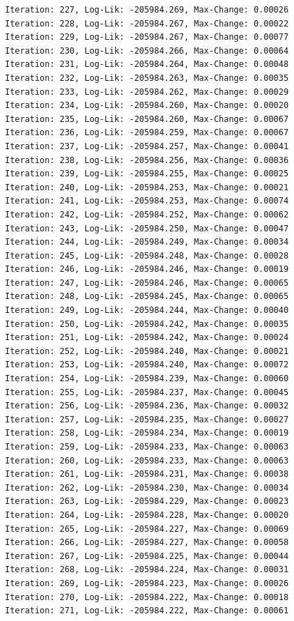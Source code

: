 \documentclass[
  letterpaper,
  DIV=11,
  numbers=noendperiod]{scrreport}
\begin{document}
\begin{verbatim}
Iteration: 227, Log-Lik: -205984.269, Max-Change: 0.00026
Iteration: 228, Log-Lik: -205984.267, Max-Change: 0.00022
Iteration: 229, Log-Lik: -205984.267, Max-Change: 0.00077
Iteration: 230, Log-Lik: -205984.266, Max-Change: 0.00064
Iteration: 231, Log-Lik: -205984.264, Max-Change: 0.00048
Iteration: 232, Log-Lik: -205984.263, Max-Change: 0.00035
Iteration: 233, Log-Lik: -205984.262, Max-Change: 0.00029
Iteration: 234, Log-Lik: -205984.260, Max-Change: 0.00020
Iteration: 235, Log-Lik: -205984.260, Max-Change: 0.00067
Iteration: 236, Log-Lik: -205984.259, Max-Change: 0.00067
Iteration: 237, Log-Lik: -205984.257, Max-Change: 0.00041
Iteration: 238, Log-Lik: -205984.256, Max-Change: 0.00036
Iteration: 239, Log-Lik: -205984.255, Max-Change: 0.00025
Iteration: 240, Log-Lik: -205984.253, Max-Change: 0.00021
Iteration: 241, Log-Lik: -205984.253, Max-Change: 0.00074
Iteration: 242, Log-Lik: -205984.252, Max-Change: 0.00062
Iteration: 243, Log-Lik: -205984.250, Max-Change: 0.00047
Iteration: 244, Log-Lik: -205984.249, Max-Change: 0.00034
Iteration: 245, Log-Lik: -205984.248, Max-Change: 0.00028
Iteration: 246, Log-Lik: -205984.246, Max-Change: 0.00019
Iteration: 247, Log-Lik: -205984.246, Max-Change: 0.00065
Iteration: 248, Log-Lik: -205984.245, Max-Change: 0.00065
Iteration: 249, Log-Lik: -205984.244, Max-Change: 0.00040
Iteration: 250, Log-Lik: -205984.242, Max-Change: 0.00035
Iteration: 251, Log-Lik: -205984.242, Max-Change: 0.00024
Iteration: 252, Log-Lik: -205984.240, Max-Change: 0.00021
Iteration: 253, Log-Lik: -205984.240, Max-Change: 0.00072
Iteration: 254, Log-Lik: -205984.239, Max-Change: 0.00060
Iteration: 255, Log-Lik: -205984.237, Max-Change: 0.00045
Iteration: 256, Log-Lik: -205984.236, Max-Change: 0.00032
Iteration: 257, Log-Lik: -205984.235, Max-Change: 0.00027
Iteration: 258, Log-Lik: -205984.234, Max-Change: 0.00019
Iteration: 259, Log-Lik: -205984.233, Max-Change: 0.00063
Iteration: 260, Log-Lik: -205984.233, Max-Change: 0.00063
Iteration: 261, Log-Lik: -205984.231, Max-Change: 0.00038
Iteration: 262, Log-Lik: -205984.230, Max-Change: 0.00034
Iteration: 263, Log-Lik: -205984.229, Max-Change: 0.00023
Iteration: 264, Log-Lik: -205984.228, Max-Change: 0.00020
Iteration: 265, Log-Lik: -205984.227, Max-Change: 0.00069
Iteration: 266, Log-Lik: -205984.227, Max-Change: 0.00058
Iteration: 267, Log-Lik: -205984.225, Max-Change: 0.00044
Iteration: 268, Log-Lik: -205984.224, Max-Change: 0.00031
Iteration: 269, Log-Lik: -205984.223, Max-Change: 0.00026
Iteration: 270, Log-Lik: -205984.222, Max-Change: 0.00018
Iteration: 271, Log-Lik: -205984.222, Max-Change: 0.00061

\end{verbatim}
\end{document}
